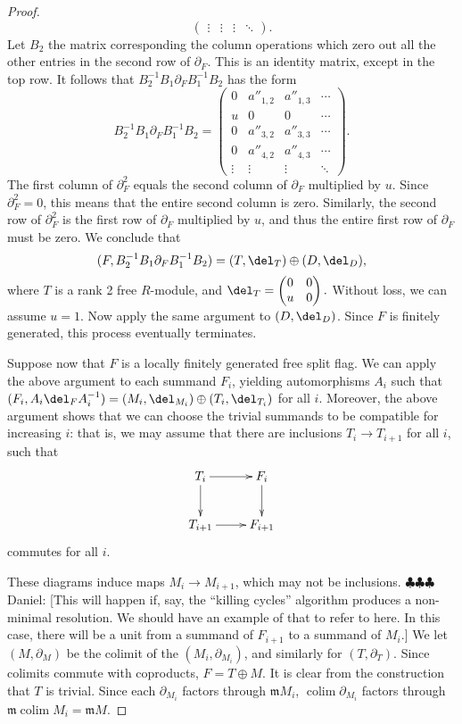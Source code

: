 \documentclass[12pt]{amsart}
\theoremstyle{definition}
\theoremstyle{remark}
\newcommand{\daniel}[1]{{\color{blue} \sf $\clubsuit\clubsuit\clubsuit$ Daniel: [#1]}}
\def\on{\operatorname}
\begin{document}
\begin{proof}
\[\begin{pmatrix}
\vdots&\vdots&\vdots&\ddots
\end{pmatrix}.
\]
Let $B_2$ the matrix corresponding the column operations which zero out all the other entries in the second row of $\partial_F$.  This is an identity matrix, except in the top row.  It follows that $B_2^{-1}B_1\partial_F B_1^{-1}B_2$ has the form
\[
B_2^{-1}B_1\partial_F B_1^{-1}B_2
=
\begin{pmatrix}
0&a''_{1,2}&a''_{1,3}&\cdots \\
u&0&0&\cdots \\
0&a''_{3,2}&a''_{3,3}&\cdots\\
0&a''_{4,2}&a''_{4,3}&\cdots\\
\vdots&\vdots&\vdots&\ddots
\end{pmatrix}.
\]
The first column of $\partial_F^2$ equals the second column of $\partial_F$ multiplied by $u$. Since $\partial_F^2=0$, this means that the entire second column is zero.  Similarly, the second row of $\partial_F^2$ is the first row of $\partial_F$ multiplied by $u$, and thus the entire first row of $\partial_F$ must be zero. We conclude that
$$
(F, B_2^{-1}B_1\partial_F B_1^{-1}B_2) = (T, \del_T) \oplus (D, \del_D),
$$
where $T$ is a rank 2 free $R$-module, and $\del_T = \begin{pmatrix} 0&0\\u&0 \end{pmatrix}.$ Without loss, we can assume $u = 1$. Now apply the same argument to $(D, \del_D)$. Since $F$ is finitely generated, this process eventually terminates.  

Suppose now that $F$ is a locally finitely generated free split flag. We can apply the above argument to each summand $F_i$, yielding automorphisms $A_i$ such that $(F_i, A_i \del_F A_i^{-1}) = (M_i, \del_{M_i}) \oplus (T_i, \del_{T_i})$ for all $i$. Moreover, the above argument shows that we can choose the trivial summands to be compatible for increasing $i$: that is, we may assume that there are inclusions $T_i \to T_{i+1}$ for all $i$, such that
\[
\xymatrix{
T_i \ar[r]\ar[d]&F_i\ar[d]\\
T_{i+1}\ar[r]&F_{i+1}
}
\]
commutes for all $i$. 
\iffalse
It follows that the diagram
\[
\xymatrix{
T_i \ar[d]&\ar[l]F_i\ar[d]\\
T_{i+1}&\ar[l]F_{i+1},
}
\]
where the horizontal maps are the projections, also commutes. 
\fi
These diagrams induce maps $M_{i}\to M_{i+1}$, which may not be inclusions.  \daniel{This will happen if, say, the ``killing cycles'' algorithm produces a non-minimal resolution.  We should have an example of that to refer to here.  In this case, there will be a unit from a summand of $F_{i+1}$ to a summand of $M_i$.}  We let $(M,\partial_M)$ be the colimit of the $(M_i,\partial_{M_i})$, and similarly for $(T,\partial_T)$.  Since colimits commute with coproducts, $F=T \oplus M$.  It is clear from the construction that $T$ is trivial. Since each $\partial_{M_i}$ factors through $\mathfrak mM_i$, $\on{colim} \partial_{M_i}$ factors through $\mathfrak m \on{colim} M_i=\mathfrak m M$.  
\end{proof}
\end{document}
